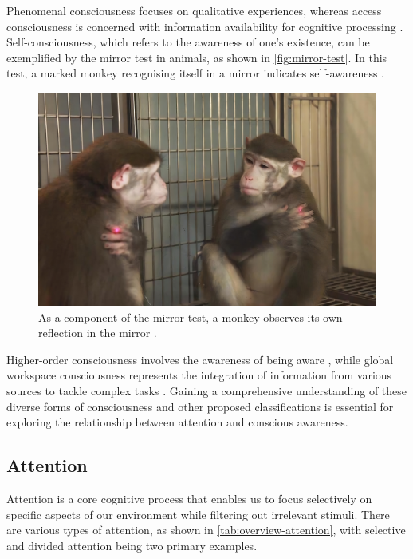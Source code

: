 \documentclass[10pt]{article}
\begin{document}
\begin{sloppypar}
  Phenomenal consciousness focuses on qualitative experiences, whereas access consciousness is concerned with information availability for cognitive processing \citep{aru_phenomenal_2013,block_two_2005}. Self-consciousness, which refers to the awareness of one’s existence, can be exemplified by the mirror test in animals, as shown in \autoref{fig:mirror-test}. In this test, a marked monkey recognising itself in a mirror indicates self-awareness \citep{chang_mirror-induced_2015}.

  \begin{figure}[ht]
    \centering
    \includegraphics[width=\textwidth]{figures/mirror.jpg}
    \caption[As a component of the mirror test, a monkey observes its own reflection in the mirror
    ]{As a component of the mirror test, a monkey observes its own reflection in the mirror \citep{chang_mirror-induced_2015}.}
    \label{fig:mirror-test}
  \end{figure}

  Higher-order consciousness involves the awareness of being aware \citep{carruthers_higher-order_2020}, while global workspace consciousness represents the integration of information from various sources to tackle complex tasks \citep{baars_essential_1997}. Gaining a comprehensive understanding of these diverse forms of consciousness and other proposed classifications is essential for exploring the relationship between attention and conscious awareness.

  \subsection{Attention}
  \label{sec:attention}

  Attention is a core cognitive process that enables us to focus selectively on specific aspects of our environment while filtering out irrelevant stimuli. There are various types of attention, as shown in \autoref{tab:overview-attention}, with selective \citep{koivisto_relationship_2009} and divided attention \citep{mckanna_divided_2009} being two primary examples.


\end{sloppypar}
\end{document}

